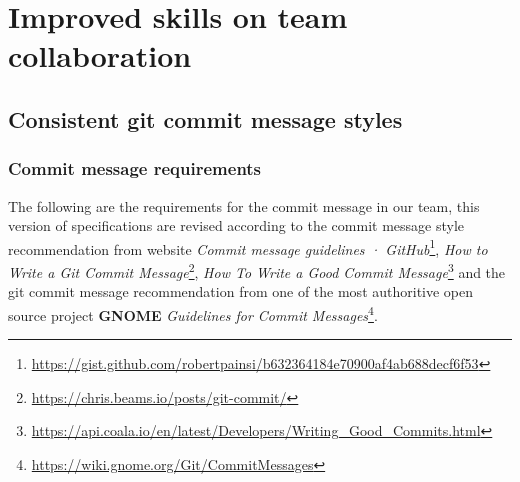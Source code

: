 \documentclass[a4paper]{report}
\begin{document}
\chapter{Improved skills on team collaboration}
\section{Consistent git commit message styles}
\subsection{Commit message requirements}
The following are the requirements for the commit message in our team, this version of specifications are revised according to the commit message style recommendation from website \emph{Commit message guidelines · GitHub}\footnote{\url{https://gist.github.com/robertpainsi/b632364184e70900af4ab688decf6f53}}, \emph{How to Write a Git Commit Message}\footnote{\url{https://chris.beams.io/posts/git-commit/}}, \emph{How To Write a Good Commit Message}\footnote{\url{https://api.coala.io/en/latest/Developers/Writing_Good_Commits.html}} and the git commit message recommendation from one of the most authoritive open source project \textbf{GNOME} \emph{Guidelines for Commit Messages}\footnote{\url{https://wiki.gnome.org/Git/CommitMessages}}.
\end{document}
